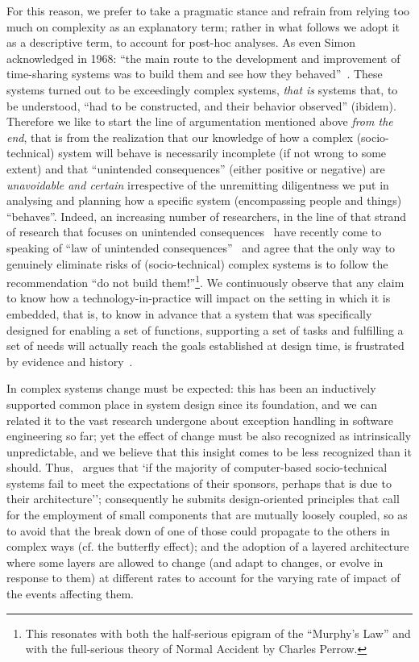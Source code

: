 \documentclass{article}
\begin{document}
For this reason, we prefer to take a pragmatic stance and refrain from relying too much on complexity as an explanatory term; rather in what follows we adopt it as a descriptive term, to account for post-hoc analyses. As even Simon acknowledged in 1968: ``the main route to the development and improvement of time-sharing systems was to build them and see how they behaved''~\citep[p. 20]{simon_sciences_1981}. These systems turned out to be exceedingly complex systems, \emph{that is} systems that, to be understood, ``had to be constructed, and their behavior observed'' (ibidem). Therefore we like to start the line of argumentation mentioned above \emph{from the end}, that is from the realization that our knowledge of how a complex (socio-technical) system will behave is necessarily incomplete (if not wrong to some extent) and that ``unintended consequences'' (either positive or negative) are \emph{unavoidable and certain} irrespective of the unremitting diligentness we put in analysing and planning how a specific system (encompassing people and things) ``behaves''. Indeed, an increasing number of researchers, in the line of that strand of research that focuses on unintended consequences~\citep[e.g.,~][]{merton_unanticipated_1936,tenner_why_1997,ash_unintended_2004} have recently come to speaking of ``law of unintended consequences''~\citep[e.g., ][]{mansfield_nature_2010} and agree that the only way to genuinely eliminate risks of (socio-technical) complex systems is to follow the recommendation ``do not build them!''\citep[p. 10]{hanseth_risk_2007}\footnote{This resonates with both the half-serious epigram of the ``Murphy's Law'' and with the full-serious theory of Normal Accident by Charles Perrow.}. We continuously observe that any claim to know how a technology-in-practice will impact on the setting in which it is embedded, that is, to know in advance that a system that was specifically designed for enabling a set of functions, supporting a set of tasks and fulfilling a set of needs will actually reach the goals established at design time, is frustrated by evidence and history~\citep{jones_patterns_1996,rochlin_trapped_1998}. 

In complex systems change must be expected: this has been an inductively supported common place in system design since its foundation, and we can related it to the vast research undergone about exception handling in software engineering so far; yet the effect of change must be also recognized as intrinsically unpredictable, and we believe that this insight comes to be less recognized than it should. Thus,~\citet[p. 25]{mansfield_nature_2010} argues that `if the majority of computer-based socio-technical systems fail to meet the expectations of their sponsors, perhaps that is due to their architecture''; consequently he submits design-oriented principles that call for the employment of small components that are mutually loosely coupled, so as to avoid that the break down of one of those could propagate to the others in complex ways (cf. the butterfly effect); and the adoption of a layered architecture where some layers are allowed to change (and adapt to changes, or evolve in response to them) at different rates to account for the varying rate of impact of the events affecting them. 
\end{document}
